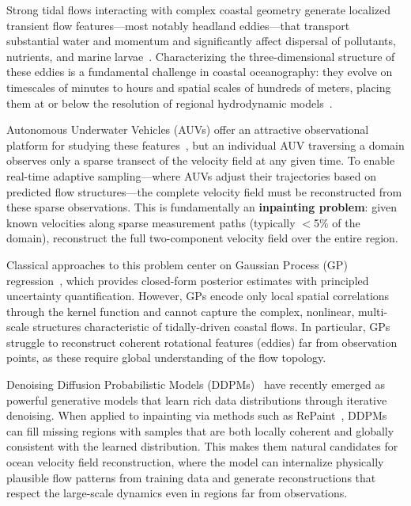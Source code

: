 \documentclass{article}
\begin{document}
Strong tidal flows interacting with complex coastal geometry generate localized transient flow features---most notably headland eddies---that transport substantial water and momentum and significantly affect dispersal of pollutants, nutrients, and marine larvae~\citep{signell1991transient, pareja2024circulation, andutta2012sticky, wolanski2000sticky}. Characterizing the three-dimensional structure of these eddies is a fundamental challenge in coastal oceanography: they evolve on timescales of minutes to hours and spatial scales of hundreds of meters, placing them at or below the resolution of regional hydrodynamic models~\citep{caley2024domain}.

Autonomous Underwater Vehicles (AUVs) offer an attractive observational platform for studying these features~\citep{kukulya2016development, allen1997remus, jones2005slocum}, but an individual AUV traversing a domain observes only a sparse transect of the velocity field at any given time. To enable real-time adaptive sampling---where AUVs adjust their trajectories based on predicted flow structures---the complete velocity field must be reconstructed from these sparse observations. This is fundamentally an \textbf{inpainting problem}: given known velocities along sparse measurement paths (typically $<$5\% of the domain), reconstruct the full two-component velocity field over the entire region.

Classical approaches to this problem center on Gaussian Process (GP) regression~\citep{rasmussen2006gp}, which provides closed-form posterior estimates with principled uncertainty quantification. However, GPs encode only local spatial correlations through the kernel function and cannot capture the complex, nonlinear, multi-scale structures characteristic of tidally-driven coastal flows. In particular, GPs struggle to reconstruct coherent rotational features (eddies) far from observation points, as these require global understanding of the flow topology.

Denoising Diffusion Probabilistic Models (DDPMs)~\citep{ho2020ddpm} have recently emerged as powerful generative models that learn rich data distributions through iterative denoising. When applied to inpainting via methods such as RePaint~\citep{lugmayr2022repaint}, DDPMs can fill missing regions with samples that are both locally coherent and globally consistent with the learned distribution. This makes them natural candidates for ocean velocity field reconstruction, where the model can internalize physically plausible flow patterns from training data and generate reconstructions that respect the large-scale dynamics even in regions far from observations.
\end{document}
